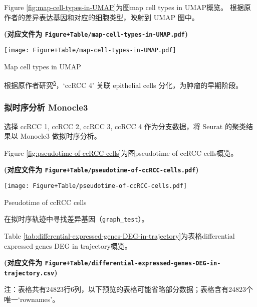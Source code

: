 \documentclass[
]{article}
\begin{document}
Figure \ref{fig:map-cell-types-in-UMAP}为图map cell types in UMAP概览。
根据原作者的差异表达基因和对应的细胞类型，映射到 UMAP 图中。

\textbf{(对应文件为 \texttt{Figure+Table/map-cell-types-in-UMAP.pdf})}

\def\@captype{figure}
\begin{center}
\texttt{[image: Figure+Table/map-cell-types-in-UMAP.pdf]}
\caption{Map cell types in UMAP}\label{fig:map-cell-types-in-UMAP}
\end{center}

根据原作者研究\textsuperscript{\protect\hyperlink{ref-IntegrativeSinYuZh2023}{5}}，`ccRCC 4' 关联 epithelial cells 分化，为肿瘤的早期阶段。

\hypertarget{ux62dfux65f6ux5e8fux5206ux6790-monocle3}{%
\subsubsection{拟时序分析 Monocle3}\label{ux62dfux65f6ux5e8fux5206ux6790-monocle3}}

选择 ccRCC 1, ccRCC 2, ccRCC 3, ccRCC 4 作为分支数据，将 Seurat 的聚类结果以 Monocle3 做拟时序分析。

Figure \ref{fig:pseudotime-of-ccRCC-cells}为图pseudotime of ccRCC cells概览。

\textbf{(对应文件为 \texttt{Figure+Table/pseudotime-of-ccRCC-cells.pdf})}

\def\@captype{figure}
\begin{center}
\texttt{[image: Figure+Table/pseudotime-of-ccRCC-cells.pdf]}
\caption{Pseudotime of ccRCC cells}\label{fig:pseudotime-of-ccRCC-cells}
\end{center}

在拟时序轨迹中寻找差异基因（\texttt{graph\_test}）。

Table \ref{tab:differential-expressed-genes-DEG-in-trajectory}为表格differential expressed genes DEG in trajectory概览。

\textbf{(对应文件为 \texttt{Figure+Table/differential-expressed-genes-DEG-in-trajectory.csv})}

\begin{center}\begin{tcolorbox}[colback=gray!10, colframe=gray!50, width=0.9\linewidth, arc=1mm, boxrule=0.5pt]注：表格共有24823行6列，以下预览的表格可能省略部分数据；表格含有24823个唯一`rownames'。
\end{tcolorbox}
\end{center}
\end{document}
